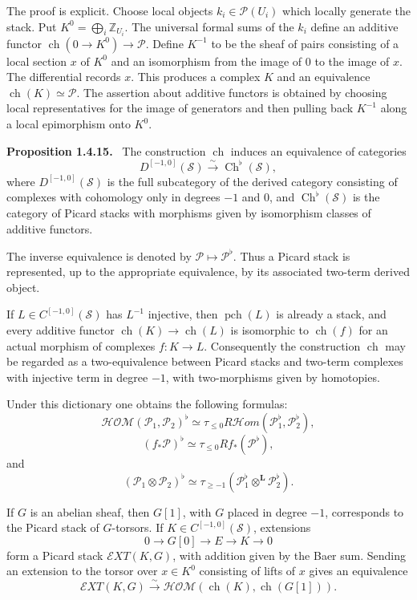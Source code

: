 \documentclass[12pt]{article}
\newcommand{\Ss}{\mathcal S}
\newcommand{\Pp}{\mathcal P}
\newcommand{\Zz}{\mathbb Z}
\newenvironment{statement}[1]{\par\medskip\noindent\textbf{#1.}\ }{\par\medskip}
\begin{document}
The proof is explicit. Choose local objects \(k_i\in\Pp(U_i)\) which locally generate the stack. Put \(K^0=\bigoplus_i\Zz_{U_i}\). The universal formal sums of the \(k_i\) define an additive functor \(\operatorname{ch}(0\to K^0)\to\Pp\). Define \(K^{-1}\) to be the sheaf of pairs consisting of a local section \(x\) of \(K^0\) and an isomorphism from the image of \(0\) to the image of \(x\). The differential records \(x\). This produces a complex \(K\) and an equivalence \(\operatorname{ch}(K)\simeq\Pp\). The assertion about additive functors is obtained by choosing local representatives for the image of generators and then pulling back \(K^{-1}\) along a local epimorphism onto \(K^0\).

\begin{statement}{Proposition 1.4.15}
The construction \(\operatorname{ch}\) induces an equivalence of categories
\[
D^{[-1,0]}(\Ss)\xrightarrow{\sim}\operatorname{Ch}^{\flat}(\Ss),
\]
where \(D^{[-1,0]}(\Ss)\) is the full subcategory of the derived category consisting of complexes with cohomology only in degrees \(-1\) and \(0\), and \(\operatorname{Ch}^{\flat}(\Ss)\) is the category of Picard stacks with morphisms given by isomorphism classes of additive functors.
\end{statement}

The inverse equivalence is denoted by \(\Pp\mapsto\Pp^{\flat}\). Thus a Picard stack is represented, up to the appropriate equivalence, by its associated two-term derived object.

If \(L\in C^{[-1,0]}(\Ss)\) has \(L^{-1}\) injective, then \(\operatorname{pch}(L)\) is already a stack, and every additive functor \(\operatorname{ch}(K)\to\operatorname{ch}(L)\) is isomorphic to \(\operatorname{ch}(f)\) for an actual morphism of complexes \(f:K\to L\). Consequently the construction \(\operatorname{ch}\) may be regarded as a two-equivalence between Picard stacks and two-term complexes with injective term in degree \(-1\), with two-morphisms given by homotopies.

Under this dictionary one obtains the following formulas:
\[
\mathcal{HOM}(\Pp_1,\Pp_2)^{\flat}
\simeq
\tau_{\leq0}R\mathcal{H}om(\Pp_1^{\flat},\Pp_2^{\flat}),
\tag{1.4.18}
\]
\[
(f_*\Pp)^{\flat}
\simeq
\tau_{\leq0}Rf_*(\Pp^{\flat}),
\tag{1.4.19}
\]
and
\[
(\Pp_1\otimes\Pp_2)^{\flat}
\simeq
\tau_{\geq -1}(\Pp_1^{\flat}\otimes^{\mathbf L}\Pp_2^{\flat}).
\tag{1.4.20}
\]

If \(G\) is an abelian sheaf, then \(G[1]\), with \(G\) placed in degree \(-1\), corresponds to the Picard stack of \(G\)-torsors. If \(K\in C^{[-1,0]}(\Ss)\), extensions
\[
0\to G[0]\to E\to K\to0
\]
form a Picard stack \(\mathcal{E}XT(K,G)\), with addition given by the Baer sum. Sending an extension to the torsor over \(x\in K^0\) consisting of lifts of \(x\) gives an equivalence
\[
\mathcal{E}XT(K,G)\xrightarrow{\sim}
\mathcal{HOM}(\operatorname{ch}(K),\operatorname{ch}(G[1])).
\tag{1.4.23}
\]
\end{document}
